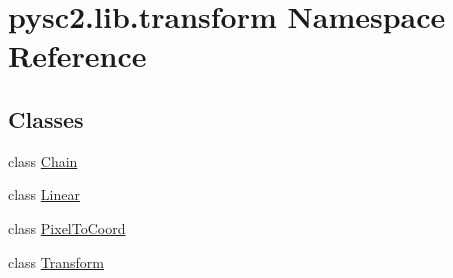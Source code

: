 \hypertarget{namespacepysc2_1_1lib_1_1transform}{}\section{pysc2.\+lib.\+transform Namespace Reference}
\label{namespacepysc2_1_1lib_1_1transform}
\subsection*{Classes}
\begin{DoxyCompactItemize}
\item 
class \mbox{\hyperlink{classpysc2_1_1lib_1_1transform_1_1_chain}{Chain}}
\item 
class \mbox{\hyperlink{classpysc2_1_1lib_1_1transform_1_1_linear}{Linear}}
\item 
class \mbox{\hyperlink{classpysc2_1_1lib_1_1transform_1_1_pixel_to_coord}{Pixel\+To\+Coord}}
\item 
class \mbox{\hyperlink{classpysc2_1_1lib_1_1transform_1_1_transform}{Transform}}
\end{DoxyCompactItemize}
